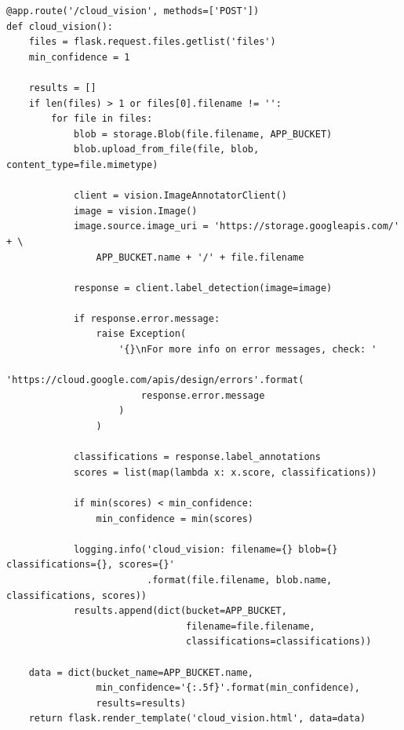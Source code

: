 \documentclass[a4paper, 11pt]{article}
\newenvironment{code}{\captionsetup{type=listing}}{}
\begin{document}
\begin{appendix}
\begin{code}
\begin{verbatim}
@app.route('/cloud_vision', methods=['POST'])
def cloud_vision():
    files = flask.request.files.getlist('files')
    min_confidence = 1

    results = []
    if len(files) > 1 or files[0].filename != '':
        for file in files:
            blob = storage.Blob(file.filename, APP_BUCKET)
            blob.upload_from_file(file, blob, content_type=file.mimetype)

            client = vision.ImageAnnotatorClient()
            image = vision.Image()
            image.source.image_uri = 'https://storage.googleapis.com/' + \
                APP_BUCKET.name + '/' + file.filename

            response = client.label_detection(image=image)

            if response.error.message:
                raise Exception(
                    '{}\nFor more info on error messages, check: '
                    'https://cloud.google.com/apis/design/errors'.format(
                        response.error.message
                    )
                )

            classifications = response.label_annotations
            scores = list(map(lambda x: x.score, classifications))

            if min(scores) < min_confidence:
                min_confidence = min(scores)

            logging.info('cloud_vision: filename={} blob={} classifications={}, scores={}'
                         .format(file.filename, blob.name, classifications, scores))
            results.append(dict(bucket=APP_BUCKET,
                                filename=file.filename,
                                classifications=classifications))

    data = dict(bucket_name=APP_BUCKET.name,
                min_confidence='{:.5f}'.format(min_confidence),
                results=results)
    return flask.render_template('cloud_vision.html', data=data)
\end{verbatim}
\label{code:cloud_vision}
\end{code}

\end{appendix}
\end{document}
